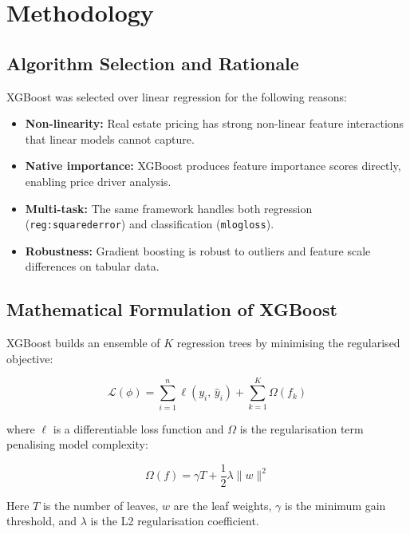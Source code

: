 \documentclass[12pt,a4paper]{article}
\begin{document}
\section{Methodology}

\subsection{Algorithm Selection and Rationale}

XGBoost was selected over linear regression for the following reasons:

\begin{itemize}
    \item \textbf{Non-linearity:} Real estate pricing has strong non-linear
          feature interactions that linear models cannot capture.
    \item \textbf{Native importance:} XGBoost produces feature importance
          scores directly, enabling price driver analysis.
    \item \textbf{Multi-task:} The same framework handles both regression
          (\texttt{reg:squarederror}) and classification (\texttt{mlogloss}).
    \item \textbf{Robustness:} Gradient boosting is robust to outliers and
          feature scale differences on tabular data.
\end{itemize}

\subsection{Mathematical Formulation of XGBoost}

XGBoost builds an ensemble of $K$ regression trees by minimising the
regularised objective:

\begin{equation}
    \mathcal{L}(\phi) = \sum_{i=1}^{n} \ell\!\left(y_i,\, \hat{y}_i\right)
    + \sum_{k=1}^{K} \Omega(f_k)
    \label{eq:xgb_obj}
\end{equation}

where $\ell$ is a differentiable loss function and $\Omega$ is the
regularisation term penalising model complexity:

\begin{equation}
    \Omega(f) = \gamma T + \frac{1}{2}\lambda \| w \|^2
    \label{eq:reg}
\end{equation}

Here $T$ is the number of leaves, $w$ are the leaf weights, $\gamma$ is the
minimum gain threshold, and $\lambda$ is the L2 regularisation coefficient.
\end{document}
